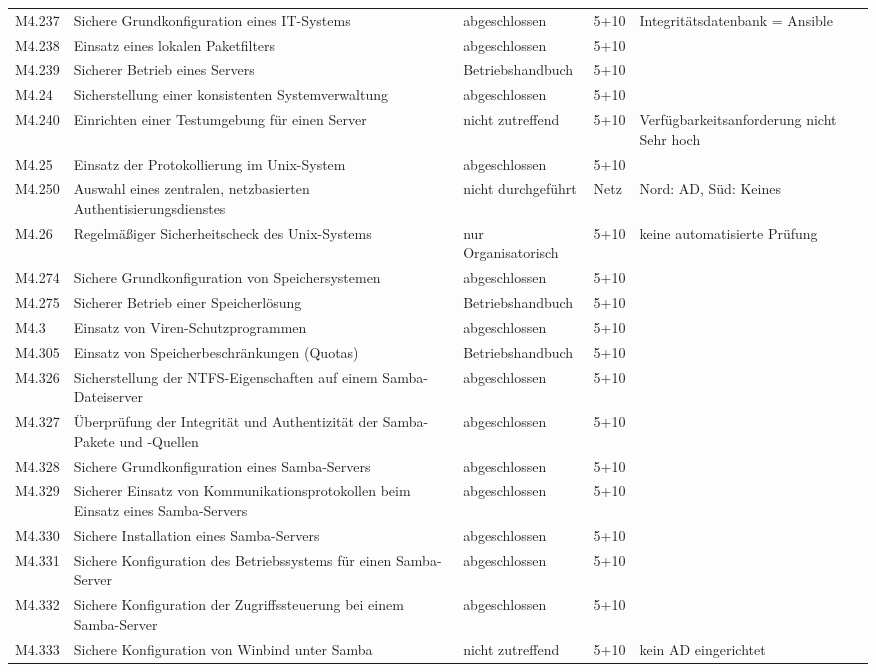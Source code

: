 \begin{longtable}{lp{3.7cm}p{3cm}lp{3.8cm}}
M4.237 & Sichere Grundkonfiguration eines IT-Systems & abgeschlossen & 5+10 & Integritätsdatenbank = Ansible \\
M4.238 & Einsatz eines lokalen Paketfilters & abgeschlossen & 5+10 &  \\
M4.239 & Sicherer Betrieb eines Servers & Betriebshandbuch & 5+10 &  \\
M4.24 & Sicherstellung einer konsistenten Systemverwaltung & abgeschlossen & 5+10 &  \\
M4.240 & Einrichten einer Testumgebung für einen Server & nicht zutreffend & 5+10 & Verfügbarkeitsanforderung nicht Sehr hoch \\
M4.25 & Einsatz der Protokollierung im Unix-System & abgeschlossen & 5+10 &  \\
M4.250 & Auswahl eines zentralen, netzbasierten Authentisierungsdienstes & nicht durchgeführt & Netz & Nord: AD, Süd: Keines \\
M4.26 & Regelmäßiger Sicherheitscheck des Unix-Systems & nur Organisatorisch & 5+10 & keine automatisierte Prüfung \\
M4.274 & Sichere Grundkonfiguration von Speichersystemen & abgeschlossen & 5+10 &  \\
M4.275 & Sicherer Betrieb einer Speicherlösung & Betriebshandbuch & 5+10 &  \\
M4.3 & Einsatz von Viren-Schutzprogrammen & abgeschlossen & 5+10 &  \\
M4.305 & Einsatz von Speicherbeschränkungen (Quotas) & Betriebshandbuch & 5+10 &  \\
M4.326 & Sicherstellung der NTFS-Eigenschaften auf einem Samba-Dateiserver & abgeschlossen & 5+10 &  \\
M4.327 & Überprüfung der Integrität und Authentizität der Samba-Pakete und -Quellen & abgeschlossen & 5+10 &  \\
M4.328 & Sichere Grundkonfiguration eines Samba-Servers & abgeschlossen & 5+10 &  \\
M4.329 & Sicherer Einsatz von Kommunikationsprotokollen beim Einsatz eines Samba-Servers & abgeschlossen & 5+10 &  \\
M4.330 & Sichere Installation eines Samba-Servers & abgeschlossen & 5+10 &  \\
M4.331 & Sichere Konfiguration des Betriebssystems für einen Samba-Server & abgeschlossen & 5+10 &  \\
M4.332 & Sichere Konfiguration der Zugriffssteuerung bei einem Samba-Server & abgeschlossen & 5+10 &  \\
M4.333 & Sichere Konfiguration von Winbind unter Samba & nicht zutreffend & 5+10 & kein AD eingerichtet \\

\end{longtable}
